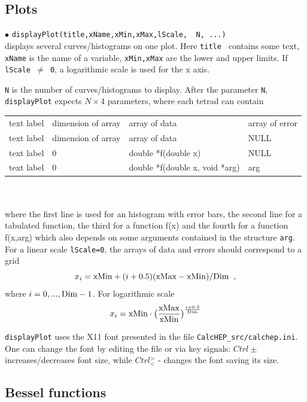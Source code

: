 \documentclass[12pt,a4paper]{article}
\begin{document}
\subsection{Plots}
\noindent$\bullet$ \verb|displayPlot(title,xName,xMin,xMax,lScale,  N, ...)|\\
displays several  curves/histograms on one plot.  Here {\tt title  } contains some text, {\tt xName} is the name of a variable, 
{\tt xMin,xMax} are the lower and upper limits. If {\tt lScale $\neq$ 0}, a logarithmic scale 
is used for the x axis.


{\tt N} is the number of
curves/histograms  to display. 
 After the parameter {\tt N}, {\tt displayPlot} expects $N\times 4$ parameters, 
where each tetrad can  contain \\


\begin{tabular}{|l|l|l|l|}
\hline
   text label &  dimension  of array     &  array of data               & array of error     \\            
   text label   &      dimension of array            &  array of data               &  NULL              \\  
  text label    &   0             & double *f(double x)  &  NULL              \\                 
   text label    &       0         & double *f(double x, void *arg)&  arg       \\
\hline    
\end{tabular}\\
\\
where the first line is used for an histogram with error bars, the second line for a tabulated function, the third for a function f(x) and the fourth for a function f(x,arg) which also depends on some arguments contained in the structure \verb|arg|.
 For a linear scale  {\tt lScale=0}, the arrays of data  and errors  should correspond to a grid
$$x_i={\rm xMin}+(i+0.5)({\rm xMax}- {\rm xMin})/{\rm Dim}\;\;,$$ 
where $i=0,...,{\rm Dim}-1$. For logarithmic scale  
   $$x_i={\rm xMin}\cdot \big(\frac{{\rm xMax}}{{\rm xMin}}\big)^\frac{i+0.5}{{\rm Dim}}$$

{\tt displayPlot} uses the X11 font presented in the  file {\tt CalcHEP\_src/calchep.ini}. One can change the font by editing the file or via key signals:
$ Ctrl\pm$ increases/decreases font size, while $ Ctrl{}^>_<$ - changes the font saving   its size.  


\subsection{Bessel functions}
\end{document}
